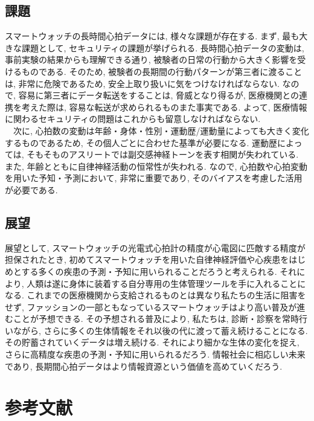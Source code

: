 \documentclass[report, 11pt, a4paper]{jsbook}
\begin{document}
\section{課題}
スマートウォッチの長時間心拍データには, 様々な課題が存在する. まず, 最も大きな課題として, セキュリティの課題が挙げられる. 長時間心拍データの変動は, 事前実験の結果からも理解できる通り, 被験者の日常の行動から大きく影響を受けるものである. そのため, 被験者の長期間の行動パターンが第三者に渡ることは, 非常に危険であるため, 安全上取り扱いに気をつけなければならない. なので, 容易に第三者にデータ転送をすることは, 脅威となり得るが, 医療機関との連携を考えた際は, 容易な転送が求められるものまた事実である. よって, 医療情報に関わるセキュリティの問題はこれからも留意しなければならない. \\
　次に, 心拍数の変動は年齢・身体・性別・運動歴/運動量によっても大きく変化するものであるため, その個人ごとに合わせた基準が必要になる. 運動歴によっては, そもそものアスリートでは副交感神経トーンを表す相関が失われている. また, 年齢とともに自律神経活動の恒常性が失われる. なので, 心拍数や心拍変動を用いた予知・予測において, 非常に重要であり, そのバイアスを考慮した活用が必要である.

\section{展望}
展望として, スマートウォッチの光電式心拍計の精度が心電図に匹敵する精度が担保されたとき, 初めてスマートウォッチを用いた自律神経評価や心疾患をはじめとする多くの疾患の予測・予知に用いられることだろうと考えられる. それにより, 人類は遂に身体に装着する自分専用の生体管理ツールを手に入れることになる. これまでの医療機関から支給されるものとは異なり私たちの生活に阻害をせず, ファッションの一部ともなっているスマートウォッチはより高い普及が進むことが予想できる. その予想される普及により, 私たちは, 診断・診察を常時行いながら, さらに多くの生体情報をそれ以後の代に渡って蓄え続けることになる. その貯蓄されていくデータは増え続ける. それにより細かな生体の変化を捉え, さらに高精度な疾患の予測・予知に用いられるだろう. 情報社会に相応しい未来であり, 長期間心拍データはより情報資源という価値を高めていくだろう. \\

\chapter{参考文献}
\end{document}
